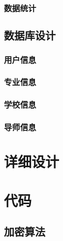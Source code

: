 \documentclass[UTF8]{ctexart}
\begin{document}
    \subsubsection{数据统计}
    \subsection{数据库设计}
    \subsubsection{用户信息}
    \subsubsection{专业信息}
    \subsubsection{学校信息}
    \subsubsection{导师信息}
    
    
    \section{详细设计}
    \section{代码}
    \subsection{加密算法}
\end{document}
